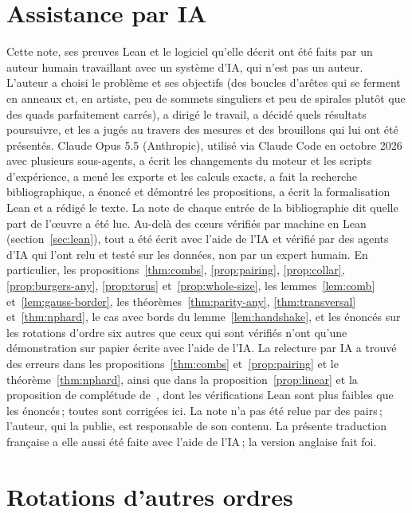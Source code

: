 \documentclass[11pt,a4paper]{article}
\begin{document}
\section*{Assistance par IA}
Cette note, ses preuves Lean et le logiciel qu'elle décrit ont été faits par
un auteur humain travaillant avec un système d'IA, qui n'est pas un auteur.
L'auteur a choisi le problème et ses objectifs (des boucles d'arêtes qui se
ferment en anneaux et, en artiste, peu de sommets singuliers et peu de
spirales plutôt que des quads parfaitement carrés), a dirigé le travail, a
décidé quels résultats poursuivre, et les a jugés au travers des mesures et
des brouillons qui lui ont été présentés. Claude Opus 5.5 (Anthropic), utilisé
via Claude Code en octobre 2026 avec plusieurs sous-agents, a écrit les
changements du moteur et les scripts d'expérience, a mené les exports et les
calculs exacts, a fait la recherche bibliographique, a énoncé et démontré les
propositions, a écrit la formalisation Lean et a rédigé le texte. La note de
chaque entrée de la bibliographie dit quelle part de l'œuvre a été lue.
Au-delà des cœurs vérifiés par machine en Lean (section~\ref{sec:lean}), tout
a été écrit avec l'aide de l'IA et vérifié par des agents d'IA qui l'ont relu
et testé sur les données, non par un expert humain. En particulier, les
propositions~\ref{thm:combs}, \ref{prop:pairing}, \ref{prop:collar},
\ref{prop:burgers-any}, \ref{prop:torus} et~\ref{prop:whole-size}, les
lemmes~\ref{lem:comb} et~\ref{lem:gauss-border}, les
théorèmes~\ref{thm:parity-any}, \ref{thm:transversal} et~\ref{thm:nphard}, le
cas avec bords du lemme~\ref{lem:handshake}, et les énoncés sur les rotations
d'ordre six autres que ceux qui sont vérifiés n'ont qu'une démonstration sur
papier écrite avec l'aide de l'IA. La relecture par IA a trouvé des erreurs
dans les propositions~\ref{thm:combs} et~\ref{prop:pairing} et le
théorème~\ref{thm:nphard}, ainsi que dans la proposition~\ref{prop:linear} et
la proposition de complétude de~\cite{gardent2026loops}, dont les
vérifications Lean sont plus faibles que les énoncés\,; toutes sont corrigées
ici. La note n'a pas été relue par des pairs\,; l'auteur, qui la publie, est
responsable de son contenu. La présente traduction française a elle aussi été
faite avec l'aide de l'IA\,; la version anglaise fait foi.




\appendix

\section{Rotations d'autres ordres}\label{app:orders}
\end{document}
